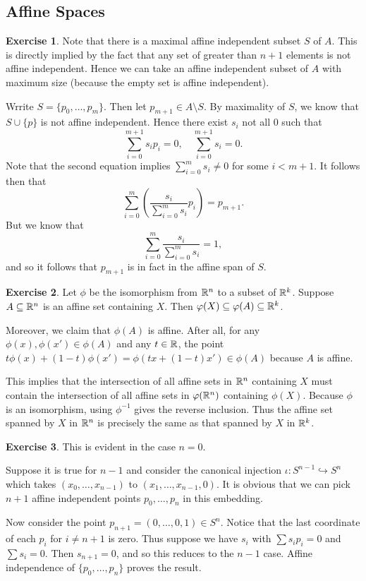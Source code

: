 \documentclass[10pt]{article}
\theoremstyle{definition}
\newtheorem{intex}{Exercise}[section]
\newenvironment{exercise}{\begin{intex}\label{\theintex}}{\end{intex}}
\begin{document}
\subsection{Affine Spaces}
\begin{exercise} \leavevmode
Note that there is a maximal affine independent subset $S$ of $A$. This is directly implied by the fact that any set of greater than $n+1$ elements is not affine independent. Hence we can take an affine independent subset of $A$ with maximum size (because the empty set is affine independent). 

Wrrite $S=\{p_0,\dots,p_m\}$. Then let $p_{m+1}\in A\setminus S$. By maximality of $S$, we know that $S\cup\{p\}$ is not affine independent. Hence there exist $s_i$ not all 0 such that \[\sum_{i=0}^{m+1}s_ip_i=0,\quad\sum_{i=0}^{m+1}s_i=0.\] Note that the second equation implies $\sum_{i=0}^ms_i\ne0$ for some $i<m+1$. It follows then that \[\sum_{i=0}^m\left(\frac{s_i}{\sum_{i=0}^ms_i}p_i\right)=p_{m+1}.\] But we know that \[\sum_{i=0}^m\frac{s_i}{\sum_{i=0}^ms_i}=1,\] and so it follows that $p_{m+1}$ is in fact in the affine span of $S$. 
\end{exercise} 

\begin{exercise} \leavevmode
Let $\phi$ be the isomorphism from $\mathbb{R}^n$ to a subset of $\mathbb{R}^k$. Suppose $A\subseteq\mathbb{R}^n$ is an affine set containing $X$. Then $\varphi(X)\subseteq\varphi(A)\subseteq\mathbb{R}^k$. 

Moreover, we claim that $\phi(A)$ is affine. After all, for any $\phi(x),\phi(x')\in\phi(A)$ and any $t\in\mathbb{R}$, the point $t\phi(x)+(1-t)\phi(x')=\phi(tx+(1-t)x')\in\phi(A)$ because $A$ is affine. 

This implies that the intersection of all affine sets in $\mathbb{R}^n$ containing $X$ must contain the intersection of all affine sets in $\varphi(\mathbb{R}^n)$ containing $\phi(X)$. Because $\phi$ is an isomorphism, using $\phi^{-1}$ gives the reverse inclusion. Thus the affine set spanned by $X$ in $\mathbb{R}^n$ is precisely the same as that spanned by $X$ in $\mathbb{R}^k$. 
\end{exercise} 

\begin{exercise} \leavevmode
This is evident in the case $n=0$. 

Suppose it is true for $n-1$ and consider the canonical injection $\iota:S^{n-1}\hookrightarrow S^n$ which takes $(x_0,\dots,x_{n-1})$ to $(x_1,\dots,x_{n-1},0)$. It is obvious that we can pick $n+1$ affine independent points $p_0,\dots,p_n$ in this embedding. 

Now consider the point $p_{n+1}=(0,\dots,0,1)\in S^n$. Notice that the last coordinate of each $p_i$ for $i\ne n+1$ is zero. Thus suppose we have $s_i$ with $\sum s_ip_i=0$ and $\sum s_i=0$. Then $s_{n+1}=0$, and so this reduces to the $n-1$ case. Affine independence of $\{p_0,\dots,p_n\}$ proves the result. 
\end{exercise} 
\end{document}
